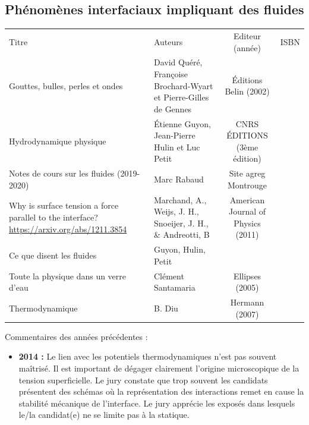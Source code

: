 \begin{headerBlock}
  \chapter{Phénomènes interfaciaux impliquant des fluides}
    \label{LP_PhenomenesInterfaciaux}
\end{headerBlock}

\begin{center}
\begin{tabularx}{\textwidth}{| X | X | c | c |}
  \hline
  \rowcolor{gray!20}\multicolumn{4}{c}{Bibliographie de la leçon : } \\
  \hline 
  Titre & Auteurs & Editeur (année) & ISBN \\
  \hline
 Gouttes, bulles, perles et ondes & David Quéré, Françoise Brochard-Wyart et Pierre-Gilles de Gennes & \'Editions Belin (2002) &    \\
  \hline 
 Hydrodynamique physique & \'Etienne Guyon, Jean-Pierre Hulin et Luc Petit  &  CNRS ÉDITIONS (3ème édition) &    \\
  \hline 
Notes de cours sur les fluides (2019-2020) & Marc Rabaud  &  Site agreg Montrouge  &    \\
  \hline 
 Why is surface tension a force parallel to the interface? \url{https://arxiv.org/abs/1211.3854} & Marchand, A., Weijs, J. H., Snoeijer, J. H., \& Andreotti, B   & American Journal of Physics (2011)  &    \\
  \hline
  Ce que disent les fluides & Guyon, Hulin, Petit & & \\
  \hline
  Toute la physique dans un verre d'eau & Clément Santamaria & Ellipses (2005) & \\
  \hline
  Thermodynamique & B. Diu & Hermann (2007) & \\
  \hline 
\end{tabularx}
\end{center}

\begin{reportBlock}{Commentaires des années précédentes :}
    \begin{itemize}
        \item \textbf{2014 :} Le lien avec les potentiels thermodynamiques n’est pas souvent maîtrisé. Il est important de dégager clairement l’origine microscopique de la tension superficielle. Le jury constate que trop souvent les candidats présentent des schémas où la représentation des interactions remet en cause la stabilité mécanique de l’interface. Le jury apprécie les exposés dans lesquels le/la candidat(e) ne se limite pas à la statique.
    \end{itemize}
\end{reportBlock}


